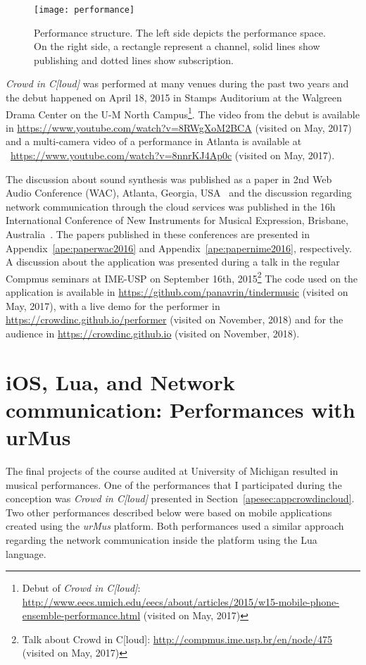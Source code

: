 \begin{figure}[t]
	\centering
	\texttt{[image: performance]}
	\caption{Performance structure. The left side depicts the performance space. On the right side, a rectangle represent a channel, solid lines show publishing and dotted lines show subscription.}
	\label{fig:performance}
\end{figure}

\textit{Crowd in C[loud]} was performed at many venues during the past two years and the debut happened on April 18, 2015 in Stamps Auditorium at the Walgreen Drama Center on the U-M North Campus\footnote{Debut of \textit{Crowd in C[loud]}: \url{http://www.eecs.umich.edu/eecs/about/articles/2015/w15-mobile-phone-ensemble-performance.html} (visited on May, 2017)}.
The video from the debut is available in \url{https://www.youtube.com/watch?v=8RWgXoM2BCA} (visited on May, 2017) and a multi-camera video of a performance in Atlanta is available at ~\url{https://www.youtube.com/watch?v=8nnrKJ4Ap0c} (visited on May, 2017).

The discussion about sound synthesis was published as a paper in 2nd Web Audio Conference (WAC), Atlanta, Georgia, USA~\citep{Lee2016crowd} and the discussion regarding network communication through the cloud services was published in the 16h International Conference of New Instruments for Musical Expression, Brisbane, Australia~\citep{deCarvalhoJunior2016understanding}.
The papers published in these conferences are presented in Appendix~\ref{ape:paperwac2016} and Appendix~\ref{ape:papernime2016}, respectively.
A discussion about the application was presented during a talk in the regular Compmus seminars at IME-USP on September 16th, 2015\footnote{Talk about Crowd in C[loud]: \url{http://compmus.ime.usp.br/en/node/475} (visited on May, 2017)}
The code used on the application is available in \url{https://github.com/panavrin/tindermusic} (visited on May, 2017), with a live demo for the performer in \url{https://crowdinc.github.io/performer} (visited on November, 2018) and for the audience in \url{https://crowdinc.github.io} (visited on November, 2018).

\section{iOS, Lua, and Network communication: Performances with urMus}
\label{apesec:appsumich}

The final projects of the course audited at University of Michigan resulted in musical performances.
One of the performances that I participated during the conception was \textit{Crowd in C[loud]} presented in Section~\ref{apesec:appcrowdincloud}.
Two other performances described below were based on mobile applications created using the \textit{urMus} platform.
Both performances used a similar approach regarding the network communication inside the platform using the Lua language.

